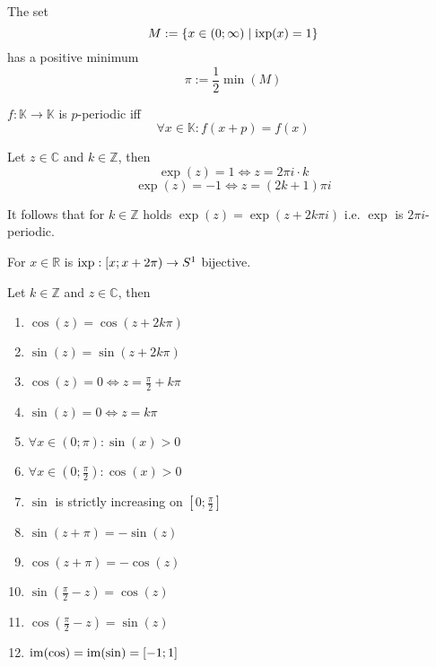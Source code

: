 \begin{theorem}
   The set
   \[M := \{x \in (0; \infty) \mid \operatorname{ixp}(x) = 1\}\]
   has a positive minimum
   \[\pi := \frac{1}{2} \min(M)\]
\end{theorem}

\begin{definition}
   \(f: \mathbb{K} \to \mathbb{K}\) is \(p\)-periodic iff
   \[\forall x \in \mathbb{K}: f(x + p) = f(x)\]
\end{definition}

\begin{theorem}
   Let \(z \in \mathbb{C}\) and \(k \in \mathbb{Z}\), then
   \[\exp(z) = 1 \iff z = 2 \pi i \cdot k\]
   \[\exp(z) = -1 \iff z = (2k + 1)\pi i\]
\end{theorem}
\begin{remark}
   It follows that for \(k \in \mathbb{Z}\) holds \(\exp(z) = \exp(z + 2k\pi i)\) i.e. \(\exp\) is \(2\pi i\)-periodic.
\end{remark}

\begin{theorem}
   For \(x \in \mathbb{R}\) is \(\operatorname{ixp}: [x; x + 2\pi) \to S^1\) bijective.
\end{theorem}

\begin{proposition}[Properties]
   Let \(k \in \mathbb{Z}\) and \(z \in \mathbb{C}\), then
   \begin{enumerate}[label=\roman*, align=Center]
      \item \(\cos(z) = \cos(z + 2k\pi)\)
      \item \(\sin(z) = \sin(z + 2k\pi)\)
      \item \(\cos(z) = 0 \iff z = \frac{\pi}{2} + k\pi\)
      \item \(\sin(z) = 0 \iff z = k\pi\)
      \item \(\forall x \in (0; \pi): \sin(x) > 0\)
      \item \(\forall x \in \left(0; \frac{\pi}{2}\right): \cos(x) > 0\)
      \item \(\sin\) is strictly increasing on \(\left[0; \frac{\pi}{2}\right]\)
      \item \(\sin(z + \pi) = -\sin(z)\)
      \item \(\cos(z + \pi) = -\cos(z)\)
      \item \(\sin\left(\frac{\pi}{2} - z\right) = \cos(z)\)
      \item \(\cos\left(\frac{\pi}{2} - z\right) = \sin(z)\)
      \item \(\operatorname{im}(\cos) = \operatorname{im}(\sin) = [-1;1]\)
   \end{enumerate}
\end{proposition}


